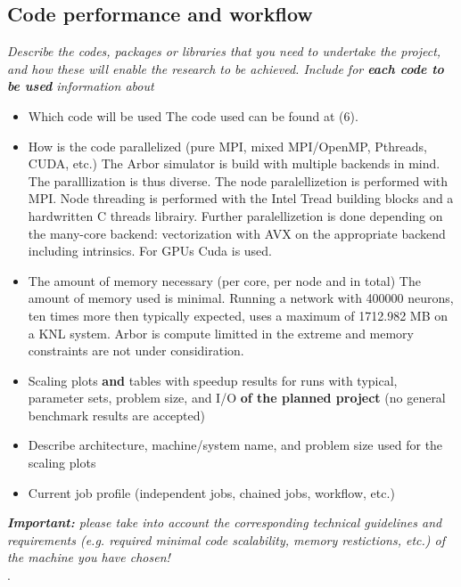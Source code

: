 \documentclass [a4paper, 12pt]{article}
\begin{document}
\subsection{Code performance and workflow}
\textit{Describe the codes, packages or libraries that you need to undertake the project, and how these will enable the research to be achieved. Include for \textbf{each code to be used} information about}
\begin{itshape}
\begin{itemize}\setlength{\itemsep}{-2pt}
  \item Which code will be used
The code used can be found at (6). 

  \item How is the code parallelized (pure MPI, mixed MPI/OpenMP, Pthreads, CUDA, etc.)
The Arbor simulator is build with multiple backends in mind. The paralllization is thus diverse. The node paralellizetion is performed with MPI. Node threading is performed with the Intel Tread  building blocks and a hardwritten C threads librairy. Further paralellizetion is done depending on the many-core backend: vectorization with AVX on the appropriate backend including intrinsics. For GPUs Cuda is used.

  \item The amount of memory necessary (per core, per node and in total)
The amount of memory used is minimal. Running a network with 400000 neurons, ten times more then typically expected, uses a maximum of 1712.982 MB on a KNL system. Arbor is compute limitted in the extreme and memory constraints are not under considiration.

  \item Scaling plots \textbf{and} tables with speedup results for runs with typical, parameter sets, problem size, and I/O \textbf{of the planned project} (no general benchmark results are accepted)
  \item Describe architecture, machine/system name, and problem size used for the scaling plots
  \item Current job profile (independent jobs, chained jobs, workflow, etc.)
\end{itemize}
\end{itshape}

{\it \textbf{Important:} please take into account the corresponding technical guidelines and requirements (e.g. required minimal code scalability, memory restictions, etc.) of the machine you have chosen!}\\
 \cite{NEST_2_12}.
\end{document}
